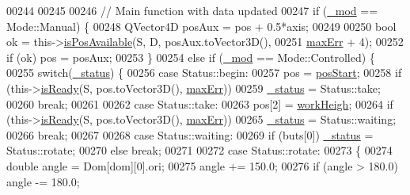 \begin{DoxyCode}
00244         
00245         
00246         \textcolor{comment}{// Main function with data updated}
00247         \textcolor{keywordflow}{if} (\hyperlink{a00009_acdecea1688594d3ab7386a6db97dd90d}{\_mod} == Mode::Manual) \{
00248             QVector4D posAux = pos + 0.5*axis;
00249             
00250             \textcolor{keywordtype}{bool} ok = this->\hyperlink{a00009_a85e5ae874d5e877b94a4a1cc78fe9598}{isPosAvailable}(S, D, posAux.toVector3D(), 
00251                                            \hyperlink{a00009_a3ecb7da23afe91883435f239bd08ceb3}{maxErr} + 4);
00252             \textcolor{keywordflow}{if} (ok) pos = posAux;            
00253         \} 
00254         \textcolor{keywordflow}{else} \textcolor{keywordflow}{if} (\hyperlink{a00009_acdecea1688594d3ab7386a6db97dd90d}{\_mod} == Mode::Controlled) \{
00255             \textcolor{keywordflow}{switch}(\hyperlink{a00009_a8d2299f41165bffe1656df776f7f7528}{\_status}) \{
00256             \textcolor{keywordflow}{case} Status::begin:
00257                 pos = \hyperlink{a00009_a232fd9d19e8f1be1d42b5801460137c6}{posStart};
00258                 \textcolor{keywordflow}{if} (this->\hyperlink{a00009_a7a58c195c66f7d668b9344b82c7ac631}{isReady}(S, pos.toVector3D(), \hyperlink{a00009_a3ecb7da23afe91883435f239bd08ceb3}{maxErr})) 
00259                     \hyperlink{a00009_a8d2299f41165bffe1656df776f7f7528}{\_status} = Status::take;                
00260                 \textcolor{keywordflow}{break};
00261                 
00262             \textcolor{keywordflow}{case} Status::take:
00263                 pos[2] = \hyperlink{a00009_a86b38e336a177d6dd31401af98b07172}{workHeigh};
00264                 \textcolor{keywordflow}{if} (this->\hyperlink{a00009_a7a58c195c66f7d668b9344b82c7ac631}{isReady}(S, pos.toVector3D(), \hyperlink{a00009_a3ecb7da23afe91883435f239bd08ceb3}{maxErr})) 
00265                     \hyperlink{a00009_a8d2299f41165bffe1656df776f7f7528}{\_status} = Status::waiting;
00266                 \textcolor{keywordflow}{break};
00267                 
00268             \textcolor{keywordflow}{case} Status::waiting:
00269                 \textcolor{keywordflow}{if} (buts[0]) \hyperlink{a00009_a8d2299f41165bffe1656df776f7f7528}{\_status} = Status::rotate;
00270                 \textcolor{keywordflow}{else} \textcolor{keywordflow}{break};
00271                 
00272             \textcolor{keywordflow}{case} Status::rotate:
00273             \{
00274                 \textcolor{keywordtype}{double} angle = Dom[dom][0].ori;
00275                 angle += 150.0;
00276                 \textcolor{keywordflow}{if} (angle > 180.0) angle -= 180.0;

\end{DoxyCode}
